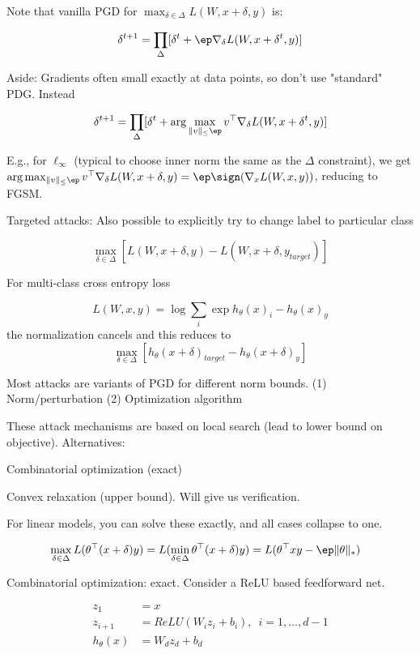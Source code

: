 \documentclass[english]{article}
\begin{document}
Note that vanilla PGD for $\max_{\delta\in\Delta} L(W,x+\delta,y)$ is: 

$$\delta^{t+1}=\prod_{\Delta}[\delta^t+\ep \nabla_\delta L(W,x+\delta^t,y)]$$ 


Aside: Gradients often small exactly at data points, so don't use "standard" PDG. Instead


$$\delta^{t+1}=\prod_{\Delta}[\delta^t+
\arg\max_{\|v\|_\le \ep} v^\top \nabla_\delta L(W,x+\delta^t,y)]$$

E.g., for $\ell_\infty$ (typical to choose inner norm the same as the $\Delta$ constraint), we get $\arg\max_{\|v\|_\le \ep} v^\top \nabla_\delta L(W,x+\delta,y) = \ep \sign(\nabla_x L(W,x,y))$, reducing to FGSM.

\item Targeted attacks: Also possible to explicitly try to change label to particular class 

$$\max_{\delta\in \Delta}[
L(W,x+\delta,y)
- 
L(W,x+\delta,y_{target})]
$$

For multi-class cross entropy loss 

$$
L(W,x,y)
= 
\log\sum_i \exp h_{\theta}(x)_i- h_{\theta}(x)_y
$$
the normalization cancels and this reduces to
$$\max_{\delta\in \Delta}[
h_{\theta}(x+\delta)_{target}
- 
h_{\theta}(x+\delta)_y]
$$

Most attacks are variants of PGD for different norm bounds. (1) Norm/perturbation (2) Optimization algorithm


\item These attack mechanisms are based on local search (lead to lower bound on objective). Alternatives: 

Combinatorial optimization (exact)

Convex relaxation (upper bound). Will give us verification. 

For linear models, you can solve these exactly, and all cases collapse to one. 


\begin{align*}
&\max_{\delta\in\Delta} L(\theta^\top(x+\delta)y) =
L(\min_{\delta\in\Delta}\theta^\top(x+\delta)y)= 
L(\theta^\top xy-\ep \|\theta\|_*)
\end{align*}

\item Combinatorial optimization: exact. Consider a ReLU based feedforward net. 

\begin{align*}
z_1&=x\\
z_{i+1} &= ReLU(W_iz_i+b_i),\,\,\,i=1,\ldots,d-1\\
h_\theta(x)&=W_dz_d+b_d
\end{align*}
\end{document}
